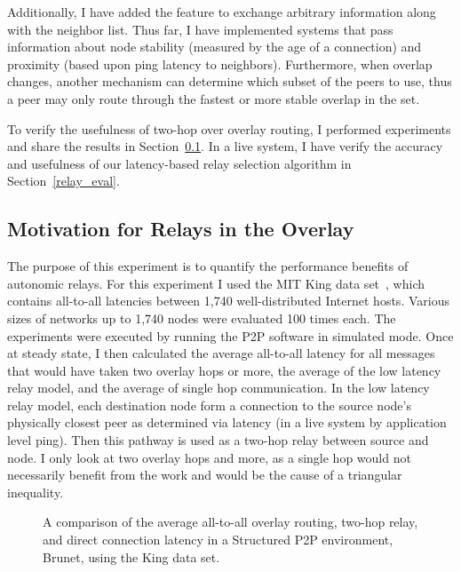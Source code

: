 Additionally, I have added the feature to exchange arbitrary information along
with the neighbor list.  Thus far, I have implemented systems that pass
information about node stability (measured by the age of a connection) and
proximity (based upon ping latency to neighbors).  Furthermore, when overlap
changes, another mechanism can determine which subset of the peers to use, thus
a peer may only route through the fastest or more stable overlap in the set.

To verify the usefulness of two-hop over overlay routing, I performed
experiments and share the results in Section~\ref{relay_motivation}.  In a live
system, I have verify the accuracy and usefulness of our latency-based relay
selection algorithm in Section~\ref{relay_eval}.

\subsection{Motivation for Relays in the Overlay}
\label{relay_motivation}

The purpose of this experiment is to quantify the performance benefits of
autonomic relays.  For this experiment I used the MIT King data
set~\cite{king_data}, which contains all-to-all latencies between 1,740
well-distributed Internet hosts.  Various sizes of networks up to 1,740 nodes
were evaluated 100 times each.  The experiments were executed by running the
P2P software in simulated mode.  Once at steady state, I then calculated the
average all-to-all latency for all messages that would have taken two overlay
hops or more, the average of the low latency relay model, and the average of
single hop communication.  In the low latency relay model, each destination
node form a connection to the source node's physically closest peer as
determined via latency (in a live system by application level ping).  Then this
pathway is used as a two-hop relay between source and node.  I only look at two
overlay hops and more, as a single hop would not necessarily benefit from the
work and would be the cause of a triangular inequality.  

\begin{figure}
\centering
{}
\caption[Motivation for relays]{A comparison of the average all-to-all overlay
routing, two-hop relay, and direct connection latency in a Structured P2P
environment, Brunet, using the King data set.}
\label{fig:simulated_relays}
\end{figure}

